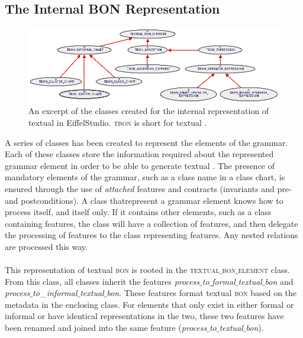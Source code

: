 \subsection{The Internal BON Representation}
\begin{figure}[h]
\centerline{
\includegraphics[scale=0.7]{images/bon-extractor-mog-overview.png}
}
\caption{An excerpt of the classes created for the internal representation of textual \bon{} in EiffelStudio. \textsc{tbon} is short for textual \bon.}
\label{fig:textual_bon_formatter}
\end{figure}
A series of classes has been created to represent the elements of the \bon{} grammar. Each of these classes store the information required about the represented grammar element in order to be able to generate textual \bon{}. The presence of mandatory elements of the grammar, such as a class name in a class chart, is ensured through the use of  \textit{attached} features and contracts (invariants and pre- and postconditions). A class thatrepresent a grammar element knows how to process itself, and itself only. If it contains other elements, such as a class containing features, the class will have a collection of features, and then delegate the processing of features to the class representing features. Any nested relations are processed this way.

\paragraph{}
This representation of textual \textsc{bon} is rooted in the \textsc{textual$\_$bon$\_$element} class. From this class, all classes inherit the features \textit{process$\_$to$\_$formal$\_$textual$\_$bon} and  \textit{process$\_$to$\_\newline$informal$\_$textual$\_$bon}. These features format textual \textsc{bon} based on the metadata in the enclosing class. For elements that only exist in either formal or informal \bon{} or have identical representations in the two, these two features have been renamed and joined into the same feature (\textit{process$\_$to$\_$textual$\_$bon}).


